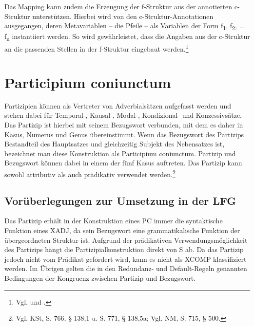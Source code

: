 \documentclass[12pt,a4paper]{article}
\begin{document}
Das Mapping kann zudem die Erzeugung der f-Struktur aus der annotierten c-Struktur unterstützen. Hierbei wird von den c-Struktur-Annotationen ausgegangen, deren Metavariablen -- die Pfeile -- als Variablen der Form f\textsubscript{1}, f\textsubscript{2}, ... f\textsubscript{n} instantiiert werden. So wird gewährleistet, dass die Angaben aus der c-Struktur an die passenden Stellen in der f-Struktur eingebaut werden.\footnote{Vgl. \cite[34]{Rohrer} und \cite[8; 10-11; 14; 17; 19; 28; 54]{Skript}.} 

\section{Participium coniunctum}
Partizipien können als Vertreter von Adverbialsätzen aufgefasst werden und stehen dabei für Temporal-, Kausal-, Modal-, Kondizional- und Konzessivsätze. Das Partizip ist hierbei mit seinem Bezugswort verbunden, mit dem es daher in Kasus, Numerus und Genus übereinstimmt. Wenn das Bezugswort des Partizips Bestandteil des Hauptsatzes und gleichzeitig Subjekt des Nebensatzes ist, bezeichnet man diese Konstruktion als Participium coniunctum. Partizip und Bezugswort können dabei in einem der fünf Kasus  auftreten. Das Partizip kann sowohl attributiv als auch prädikativ verwendet werden.\footnote{Vgl. KSt, S. 766, § 138,1 u. S. 771, § 138,5a; Vgl. NM, S. 715, § 500.} \\

\subsection{Vorüberlegungen zur Umsetzung in der LFG}
Das Partizip erhält in der Konstruktion eines PC immer die syntaktische Funktion eines XADJ, da sein Bezugswort eine grammatikalische Funktion der übergeordneten Struktur ist. Aufgrund der prädikativen Verwendungsmöglichkeit des Partizips hängt die Partizipialkonstruktion direkt von S ab. Da das Partizip jedoch nicht vom Prädikat gefordert wird, kann es nicht als XCOMP klassifiziert werden.
Im Übrigen gelten die in den Redundanz- und Default-Regeln genannten Bedingungen der Kongruenz zwischen Partizip und Bezugswort.

\end{document}
